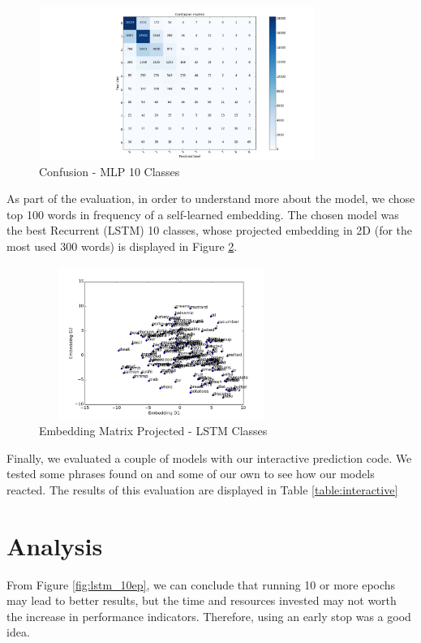 \documentclass[11pt,letterpaper]{article}
\begin{document}
   \begin{figure}[hb!]
      \centering
      \includegraphics[width=9cm, height=5cm]{confusion_matrix}
      \caption{Confusion - MLP 10 Classes}
      \label{fig:lstm_conf}
   \end{figure}
   
As part of the evaluation, in order to understand more about the model, we chose top 100 words in frequency of a self-learned embedding. The chosen model was the best Recurrent (LSTM) 10 classes, whose projected embedding in 2D (for the most used $300$ words) is displayed in Figure \ref{fig:lstm_emb}.

    \begin{figure}[ht!]
      \centering
      \includegraphics[width=8cm, height=5cm]{Classes300words}
      \caption{Embedding Matrix Projected - LSTM Classes}
      \label{fig:lstm_emb}
   \end{figure}
   
Finally, we evaluated a couple of models with our interactive prediction code. We tested some phrases found on \cite{jurafsky2014language} and some of our own to see how our models reacted.  The results of this evaluation are displayed in Table \ref{table:interactive} 


\section{Analysis}

From Figure \ref{fig:lstm_10ep}, we can conclude that running 10 or more epochs may lead to better results, but the time and resources invested may not worth the increase in performance indicators. Therefore, using an early stop was a good idea. 
\end{document}
